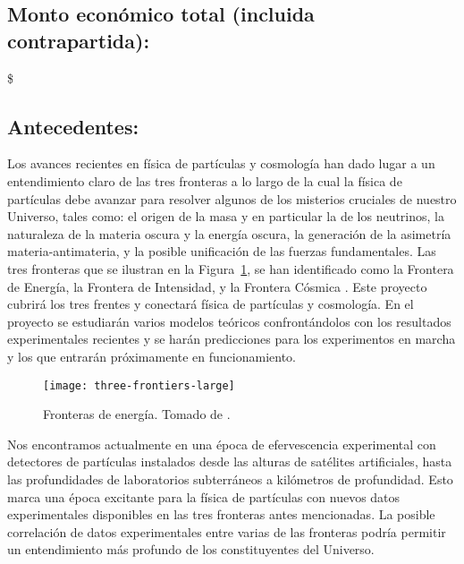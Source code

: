 \subsection{Monto económico total (incluida contrapartida):}
\$ \textbf{\totalproy}
\subsection{Antecedentes:                                  }
Los avances recientes en física de partículas y cosmología han dado
lugar a un entendimiento claro de las tres fronteras a lo largo de la
cual la física de partículas debe avanzar para resolver algunos de los
misterios cruciales de nuestro Universo, tales como: el origen de la
masa y en particular la de los neutrinos, la naturaleza de la
materia oscura y la energía oscura, la generación de la asimetría
materia-antimateria, y la posible unificación de las fuerzas fundamentales. Las tres
fronteras que se ilustran en la Figura~\ref{fig:1}, se han
identificado como la Frontera de Energía, la Frontera de Intensidad, y
la Frontera Cósmica \cite{fermilab}. Este proyecto cubrirá los tres
frentes y conectará física de partículas y cosmología. En el proyecto
se estudiarán varios modelos teóricos confrontándolos con los
resultados experimentales recientes y se harán predicciones para los
experimentos en marcha y los que entrarán próximamente en
funcionamiento.

\begin{figure}
  \centering
\texttt{[image: three-frontiers-large]}
  \caption{Fronteras de energía. Tomado de \cite{fermilab}.}
  \label{fig:1}
\end{figure}

Nos encontramos actualmente en una época de efervescencia experimental con
detectores de partículas instalados desde las alturas de satélites
artificiales, hasta las profundidades de laboratorios subterráneos a
kilómetros de profundidad. Esto marca una época excitante para la
física de partículas con nuevos datos experimentales disponibles en
las tres fronteras antes mencionadas. La posible correlación de datos
experimentales entre varias de las fronteras podría permitir un
entendimiento más profundo de los constituyentes del Universo.

